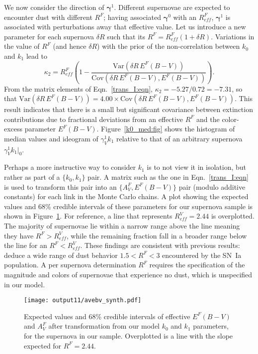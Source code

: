 \documentclass{aastex61}   	%
\begin{document}
We now consider the direction of $\pmb{\gamma}^1$. 
Different supernovae are expected to encounter dust with different $R^F$;
having  associated $\pmb{\gamma}^0$ with an $R^F_{eff}$, $\pmb{\gamma}^1$ is associated with perturbations
away that effective value.
Let us introduce a new parameter for each supernova $\delta R$ such that its $R^F = R^F_{eff}(1+  \delta R)$.
Variations in the value of $R^F$ (and hence $\delta R$) with the prior of the non-correlation between $k_0$ and $k_1$ lead 
to 
\begin{equation}
\kappa_2 = R^F_{eff} \left(1- \frac{\mbox{Var}(\delta R\, E^F(B-V))}{\mbox{Cov}(\delta R\, E^F(B-V), E^F(B-V))}\right).
\end{equation}
From the matrix elements of Eqn.~\ref{trans_I:eqn},  $\kappa_2=-5.27/0.72=-7.31$, so that $\mbox{Var}(\delta R\, E^F(B-V)) = 4.00\times\mbox{Cov}(\delta R\, E^F(B-V), E^F(B-V))$.  This result indicates that there is a small but significant covariance between  extinction contributions due to
fractional deviations from an effective $R^F$ and
the color-excess parameter $E^F(B-V)$.
Figure~\ref{k0_med:fig} shows the histogram of median values and ideogram of $\gamma^1_V k_1$
relative to that of an arbitrary supernova  $\gamma^1_V k_1|_0$. 

Perhaps a more instructive way to consider $k_1$ is to not view it in isolation, but rather as part of a $\{k_0,k_1\}$ pair.
A matrix such as the one in  Eqn.~\ref{trans_I:eqn} is used to transform this pair into an $\{A_V^F, E^F(B-V)\}$ pair
(modulo additive constants)  for each link in the Monte Carlo chains. A plot showing the expected values and 68\% credible intervals of these parameters
for our supernova
sample is shown in Figure~\ref{kk:fig}. 
For reference, a line that represents $R^V_{eff}=2.44$ is overplotted.  The majority of supernovae lie within a narrow range above the line
meaning they have $R^F > R^V_{eff}$,
while the remaining fraction fall in a broader range below the line for an $R^F < R^V_{eff}$.  
These findings are consistent with previous results:
\citet{2014ApJ...789...32B, 2015MNRAS.453.3300A} deduce a wide range of dust behavior $1.5<R^F<3$ encountered by the SN~Ia population.
A per supernova determination $R^F$ requires the specification of the magnitude and colors of supernovae that experience
no dust, which is unspecified in our model.

\begin{figure}[htbp] %
   \centering
   \texttt{[image: output11/avebv\_synth.pdf]}
      \caption{
      Expected values and 68\% credible intervals of effective $E^F(B-V)$ and $A_V^F$ after transformation from our model $k_0$ and $k_1$ parameters, for the supernova in our sample.
      Overplotted is a line with the slope expected for $R^F=2.44$.
   \label{kk:fig}}
\end{figure}
\end{document}
